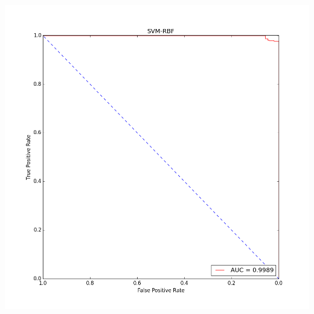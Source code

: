 \documentclass[fleqn]{article}
\begin{document}
\begin{center}
        \includegraphics[scale=0.2]{roc_SVM-RBF.png}
    \end{center}
\end{document}
